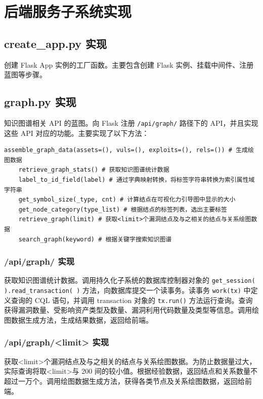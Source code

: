 \documentclass[a4paper,AutoFakeBold,oneside,12pt]{book}
\begin{document}
\section{后端服务子系统实现}

\subsection{create{\_}app.py 实现}

创建 Flask App 实例的工厂函数\cite{factory_method_design_pattern}。主要包含创建 Flask 实例、挂载中间件、注册蓝图等步骤。

\subsection{graph.py 实现}

知识图谱相关 API 的蓝图。向 Flask 注册 \lstinline|/api/graph/| 路径下的 API，并且实现这些 API 对应的功能。主要实现了以下方法：
\begin{lstlisting}[style = python]
	assemble_graph_data(assets=(), vuls=(), exploits=(), rels=()) # 生成绘图数据
	retrieve_graph_stats() # 获取知识图谱统计数据
	label_to_id_field(label) # 通过字典映射转换，将标签字符串转换为索引属性域字符串
	get_symbol_size(_type, cnt) # 计算结点在可视化力引导图中显示的大小
	get_node_category(type_list) # 根据结点的标签列表，选出主要标签
	retrieve_graph(limit) # 获取<limit>个漏洞结点及与之相关的结点与关系绘图数据
	search_graph(keyword) # 根据关键字搜索知识图谱
\end{lstlisting}

\subsubsection{/api/graph/ 实现}

获取知识图谱统计数据。调用持久化子系统的数据库控制器对象的 \lstinline|get_session( ).read_transaction( )| 方法，向数据库提交一个读事务。读事务 \lstinline|work(tx)| 中定义查询的 CQL 语句，并调用 transaction 对象的 \lstinline|tx.run()| 方法运行查询。查询获得漏洞数量、受影响资产类型及数量、漏洞利用代码数量及类型等信息。调用绘图数据生成方法，生成结果数据，返回给前端。

\subsubsection{/api/graph/<limit> 实现}

获取<limit>个漏洞结点及与之相关的结点与关系绘图数据。为防止数据量过大，实际查询将取<limit>与 200 间的较小值。根据经验数据，返回结点和关系数量不超过一万个。调用绘图数据生成方法，获得各类节点及关系绘图数据，返回给前端。
\end{document}
